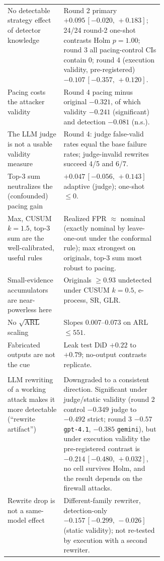 \documentclass[11pt]{article}
\newcommand{\ci}[2]{\,[#1,\,#2]}
\begin{document}
\begin{table}[H]\centering\small
\begin{tabularx}{\linewidth}{@{}>{\raggedright\arraybackslash}p{0.36\linewidth}>{\raggedright\arraybackslash}X@{}}
\toprule
\multicolumn{2}{@{}l}{\textbf{Holds}}\\
\midrule
No detectable strategy effect of detector knowledge & Round 2 primary $+0.095\ci{-0.020}{+0.183}$; 24/24 round-2 one-shot contrasts Holm $p=1.00$; round 3 all pacing-control CIs contain 0; round 4 (execution validity, pre-registered) $-0.107\ci{-0.357}{+0.120}$.\\
Pacing costs the attacker validity & Round 4 pacing minus original $-0.321$, of which validity $-0.241$ (significant) and detection $-0.081$ (n.s.).\\
The LLM judge is not a usable validity measure & Round 4: judge false-valid rates equal the base failure rates; judge-invalid rewrites succeed 4/5 and 6/7.\\
Top-3 sum neutralizes the (confounded) pacing gain & $+0.047\ci{-0.056}{+0.143}$ adaptive (judge); one-shot $\le0$.\\
Max, CUSUM $k{=}1.5$, top-3 sum are the well-calibrated, useful rules & Realized FPR $\approx$ nominal (exactly nominal by leave-one-out under the conformal rule); max strongest on originals, top-3 sum most robust to pacing.\\
Small-evidence accumulators are near-powerless here & Originals $\ge0.93$ undetected under CUSUM $k{=}0.5$, e-process, SR, GLR.\\
No $\sqrt{\mathrm{ARL}}$ scaling & Slopes 0.007--0.073 on ARL $\le551$.\\
Fabricated outputs are not the cue & Leak test DiD $+0.22$ to $+0.79$; no-output contrasts replicate.\\
\midrule
\multicolumn{2}{@{}l}{\textbf{Weakened}}\\
\midrule
LLM rewriting of a working attack makes it more detectable (``rewrite artifact'') & Downgraded to a consistent direction. Significant under judge/static validity (round 2 control $-0.349$ judge to $-0.492$ strict; round 3 $-0.57$ \texttt{gpt-4.1}, $-0.385$ \texttt{gemini}), but under execution validity the pre-registered contrast is $-0.214\ci{-0.480}{+0.032}$, no cell survives Holm, and the result depends on the firewall attacks.\\
Rewrite drop is not a same-model effect & Different-family rewriter, detection-only $-0.157\ci{-0.299}{-0.026}$ (static validity); not re-tested by execution with a second rewriter.\\

\end{tabularx}
\end{table}
\end{document}
